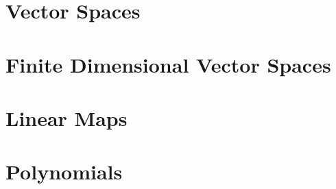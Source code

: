 \documentclass[11pt]{report}
\begin{document}

  

  \chapter{Vector Spaces}
  
  
   \clearpage
  
   \clearpage

  \chapter{Finite Dimensional Vector Spaces}
  
   \clearpage
  
   \clearpage
  
   \clearpage

  \chapter{Linear Maps}
  
   \clearpage

  
   \clearpage

  
   \clearpage

  
   \clearpage

  
   \clearpage

  
   \clearpage

  \chapter{Polynomials}
  
   \clearpage
\end{document}
